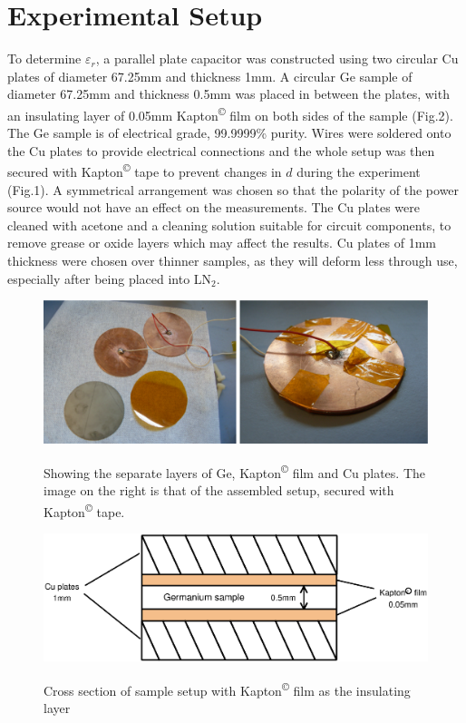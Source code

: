 \documentclass[a4paper,11pt]{article}
\begin{document}
\section{Experimental Setup}
\label{s:expSetup}
To determine $\varepsilon_{r}$, a parallel plate capacitor was constructed using two circular Cu plates of diameter 67.25mm and thickness 1mm. A circular Ge sample of diameter 67.25mm and thickness 0.5mm was placed in between the plates, with an insulating layer of 0.05mm Kapton\textsuperscript{\copyright} film on both sides of the sample (Fig.2). 
The Ge sample is of electrical grade, 99.9999\% purity. Wires were soldered onto the Cu plates to provide electrical connections and the whole setup was then secured with Kapton\textsuperscript{\copyright} tape to prevent changes in $d$ during the experiment (Fig.1). A symmetrical arrangement was chosen so that the polarity of the power source would not have an effect on the measurements. The Cu plates were cleaned with acetone and a cleaning solution suitable for circuit components, to remove grease or oxide layers which may affect the results. Cu plates of 1mm thickness were chosen over thinner samples, as they will deform less through use, especially after being placed into LN$_{2}$.


\begin{figure}[htpb]
\centering
	\includegraphics[scale=0.25]{sample_layer}
	\label{f:photosample}
	\caption{Showing the separate layers of Ge, Kapton\textsuperscript{\copyright} film and Cu plates. The image on the right is that of the assembled setup, secured with Kapton\textsuperscript{\copyright} tape.}
	
\end{figure}

\begin{figure}[htpb]
\centering
\includegraphics[scale=0.5]{crossSection}	
	\label{f:xsec}
	\caption{Cross section of sample setup with Kapton\textsuperscript{\copyright} film as the insulating layer}
\end{figure}
\end{document}
